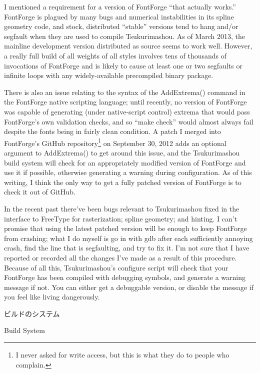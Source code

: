 \documentclass[14pt]{extarticle}
\newcommand{\blsubsection}[2]{%
\kaku\large#1\qquad\phantomsection%
\addcontentsline{toc}{subsection}{#1 #2}%
#2\par\addpenalty{-300}\normalsize}
\begin{document}
I mentioned a requirement for a version of FontForge ``that actually
works.'' FontForge is plagued by many bugs and numerical instabilities in
its spline geometry code, and stock, distributed ``stable'' versions tend to
hang and/or segfault when they are used to compile Tsukurimashou.  As of
March 2013, the mainline development version distributed as source seems to
work well.  However, a really full build of all weights of all styles
involves tens of thousands of invocations of FontForge and is likely to
cause at least one or two segfaults or infinite loops with any
widely-available precompiled binary package.

There is also an issue relating to the syntax of the AddExtrema() command in
the FontForge native scripting language; until recently, no version of
FontForge was capable of generating (under native-script control) extrema
that would pass FontForge's own validation checks, and so ``make check''
would almost always fail despite the fonts being in fairly clean
condition.  A patch I merged into FontForge's GitHub repository\footnote{I
never asked for write access, but this is what they do to people who
complain.} on September 30, 2012 adds an optional argument to
AddExtrema() to get around this issue, and the Tsukurimashou build system
will check for an appropriately modified version of FontForge and use it if
possible, otherwise generating a warning during configuration.  As of this
writing, I think the only way to get a fully patched version of FontForge is
to check it out of GitHub.

In the recent past there've been bugs relevant to Tsukurimashou fixed in the
interface to FreeType for rasterization; spline geometry; and hinting.  I
can't promise that using the latest patched version will be enough to keep
FontForge from crashing; what I do myself is go in with gdb after each
sufficiently annoying crash, find the line that is segfaulting, and try to
fix it.  I'm not sure that I have reported or recorded all the changes I've
made as a result of this procedure.  Because of all this,
Tsukurimashou's configure script will check that your FontForge has been
compiled with debugging symbols, and generate a warning message if not.  You
can either get a debuggable version, or disable the message if you feel like
living dangerously.


\clearpage
\blsubsection{ビルドのシステム}{Build System}
\end{document}
